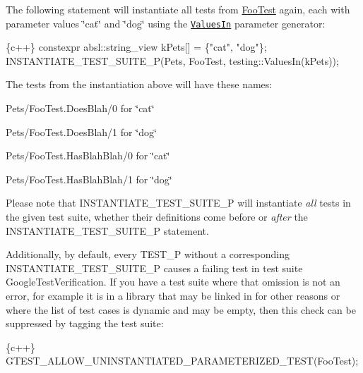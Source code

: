The following statement will instantiate all tests from {\ttfamily \mbox{\hyperlink{classFooTest}{Foo\+Test}}} again, each with parameter values {\ttfamily \char`\"{}cat\char`\"{}} and {\ttfamily \char`\"{}dog\char`\"{}} using the \href{reference/testing.md#param-generators}{\tt {\ttfamily Values\+In}} parameter generator\+:


\begin{DoxyCode}
\{c++\}
constexpr absl::string\_view kPets[] = \{"cat", "dog"\};
INSTANTIATE\_TEST\_SUITE\_P(Pets, FooTest, testing::ValuesIn(kPets));
\end{DoxyCode}


The tests from the instantiation above will have these names\+:


\begin{DoxyItemize}
\item {\ttfamily Pets/\+Foo\+Test.\+Does\+Blah/0} for {\ttfamily \char`\"{}cat\char`\"{}}
\item {\ttfamily Pets/\+Foo\+Test.\+Does\+Blah/1} for {\ttfamily \char`\"{}dog\char`\"{}}
\item {\ttfamily Pets/\+Foo\+Test.\+Has\+Blah\+Blah/0} for {\ttfamily \char`\"{}cat\char`\"{}}
\item {\ttfamily Pets/\+Foo\+Test.\+Has\+Blah\+Blah/1} for {\ttfamily \char`\"{}dog\char`\"{}}
\end{DoxyItemize}

Please note that {\ttfamily I\+N\+S\+T\+A\+N\+T\+I\+A\+T\+E\+\_\+\+T\+E\+S\+T\+\_\+\+S\+U\+I\+T\+E\+\_\+P} will instantiate {\itshape all} tests in the given test suite, whether their definitions come before or {\itshape after} the {\ttfamily I\+N\+S\+T\+A\+N\+T\+I\+A\+T\+E\+\_\+\+T\+E\+S\+T\+\_\+\+S\+U\+I\+T\+E\+\_\+P} statement.

Additionally, by default, every {\ttfamily T\+E\+S\+T\+\_\+P} without a corresponding {\ttfamily I\+N\+S\+T\+A\+N\+T\+I\+A\+T\+E\+\_\+\+T\+E\+S\+T\+\_\+\+S\+U\+I\+T\+E\+\_\+P} causes a failing test in test suite {\ttfamily Google\+Test\+Verification}. If you have a test suite where that omission is not an error, for example it is in a library that may be linked in for other reasons or where the list of test cases is dynamic and may be empty, then this check can be suppressed by tagging the test suite\+:


\begin{DoxyCode}
\{c++\}
GTEST\_ALLOW\_UNINSTANTIATED\_PARAMETERIZED\_TEST(FooTest);
\end{DoxyCode}


